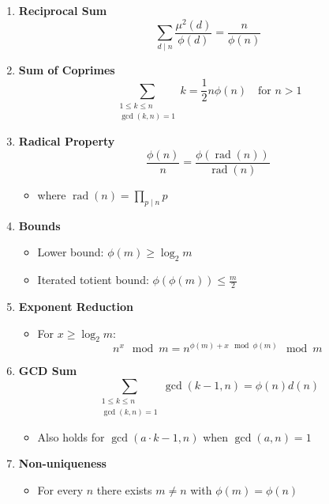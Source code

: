 \documentclass[twoside]{article}
\begin{document}
\begin{multicols*}{2}
\begin{enumerate}[leftmargin=*]
    \item \textbf{Reciprocal Sum}
        \[\sum_{d \mid n} \frac{\mu^2(d)}{\phi(d)} = \frac{n}{\phi(n)}\]
    
    \item \textbf{Sum of Coprimes}
        \[\sum_{\substack{1 \leq k \leq n \\ \gcd(k,n)=1}} k = \frac{1}{2}n\phi(n) \quad \text{for } n > 1\]
    
    \item \textbf{Radical Property}
        \[\frac{\phi(n)}{n} = \frac{\phi(\operatorname{rad}(n))}{\operatorname{rad}(n)}\]
        \begin{itemize}
            \item where $\operatorname{rad}(n) = \prod_{p \mid n} p$
        \end{itemize}
    
    \item \textbf{Bounds}
        \begin{itemize}
            \item Lower bound: $\phi(m) \geq \log_2 m$
            \item Iterated totient bound: $\phi(\phi(m)) \leq \frac{m}{2}$
        \end{itemize}
    
    \item \textbf{Exponent Reduction}
        \begin{itemize}
            \item For $x \geq \log_2 m$:
            \[n^x \mod m = n^{\phi(m) + x \mod \phi(m)} \mod m\]
        \end{itemize}
    
    \item \textbf{GCD Sum}
        \[\sum_{\substack{1 \leq k \leq n \\ \gcd(k,n)=1}} \gcd(k-1, n) = \phi(n)d(n)\]
        \begin{itemize}
            \item Also holds for $\gcd(a \cdot k - 1, n)$ when $\gcd(a,n) = 1$
        \end{itemize}
    
    \item \textbf{Non-uniqueness}
        \begin{itemize}
            \item For every $n$ there exists $m \neq n$ with $\phi(m) = \phi(n)$
        \end{itemize}
    

\end{enumerate}
\end{multicols*}
\end{document}
